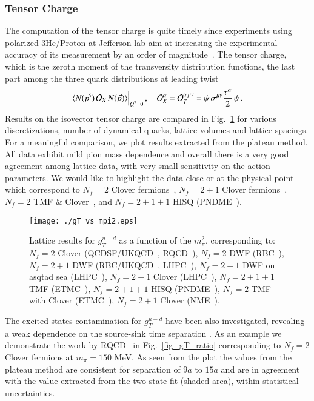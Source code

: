 \documentclass[epj]{webofc}
\newcommand{\cl}{\centerline}
\newcommand{\be}{\begin{equation}}
\newcommand{\ee}{\end{equation}}
\begin{document}
\subsubsection{Tensor Charge}
\label{sub3_1_2}

The computation of the tensor charge is quite timely since experiments using polarized 3He/Proton at Jefferson lab 
aim at increasing the experimental accuracy of its measurement by an order of magnitude~\cite{Gao:2010av}.  
The tensor charge, which is the zeroth moment of the transversity distribution functions, the last part among
the three quark distributions at leading twist
%
\be
\langle N(\vec{p'}) \, \mathcal{O}_X \, N(\vec{p}) \rangle \Big{|}_{Q^2=0} \,, \quad 
\mathcal{O}^\alpha_X = {\cal O}_T^{\alpha\,\mu\nu} = \bar{\psi}\,\sigma^{\mu\nu} \frac{\tau^\alpha}{2}\,\psi\,.
\ee
%
\noindent
Results on the isovector tensor charge are compared in Fig.~\ref{fig_gT} 
for various discretizations, number of dynamical quarks, lattice volumes and lattice spacings. For a meaningful comparison, 
we plot results extracted from the plateau method. All data exhibit mild pion mass dependence and overall there is a 
very good agreement among lattice data, with very small sensitivity on the action parameters.
We would like to highlight the data close or at the physical point which correspond to 
$N_f{=}2$ Clover fermions~\cite{Pleiter:2011gw,Bali:2014nma},
$N_f{=}2{+}1$ Clover fermions~\cite{Green:2012ej},
$N_f{=}2$ TMF $\&$ Clover~\cite{Abdel-Rehim:2015owa}, and
$N_f{=}2{+}1{+}1$ HISQ (PNDME~\cite{Bhattacharya:2016zcn}).
%
\begin{figure}[!h]
\cl{\texttt{[image: ./gT\_vs\_mpi2.eps]}}
\caption{Lattice results for $g^{u-d}_T$ as a function of the $m_\pi^2$, corresponding to: 
$N_f{=}2$ Clover (QCDSF/UKQCD~\cite{Gockeler:2005cj,Pleiter:2011gw}, RQCD~\cite{Bali:2014nma}),
$N_f{=}2$ DWF (RBC~\cite{Lin:2008uz}),
$N_f{=}2{+}1$ DWF (RBC/UKQCD~\cite{Ohta:2008kd,Aoki:2010xg}, LHPC~\cite{Green:2012ej}),
$N_f{=}2{+}1$ DWF on asqtad sea (LHPC~\cite{Bratt:2010jn,Green:2012ej}), 
$N_f{=}2{+}1$ Clover (LHPC~\cite{Green:2012ej}),
$N_f{=}2{+}1{+}1$ TMF (ETMC~\cite{Alexandrou:2013wka}), 
$N_f{=}2{+}1{+}1$ HISQ (PNDME~\cite{Bhattacharya:2016zcn}), 
$N_f{=}2$ TMF with Clover (ETMC~\cite{Abdel-Rehim:2015owa}),
$N_f{=}2{+}1$ Clover (NME~\cite{Yoon:2016jzj}).} 
\label{fig_gT}
\end{figure}
\FloatBarrier
%
The excited states contamination for $g^{u-d}_T$ have been also investigated, 
revealing a weak dependence on the source-sink time separation
\cite{Bali:2014nma,Bhattacharya:2016zcn,Abdel-Rehim:2015owa}. As an example
we demonstrate the work by RQCD~\cite{Bali:2014nma} in Fig.~\ref{fig_gT_ratio}
corresponding to $N_f{=}2$ Clover fermions at $m_\pi{=}150$ MeV. As seen from the 
plot the values from the plateau method are consistent for separation of $9a$ to $15a$ 
and are in agreement with the value extracted from the two-state fit (shaded area), within 
statistical uncertainties.
\end{document}
